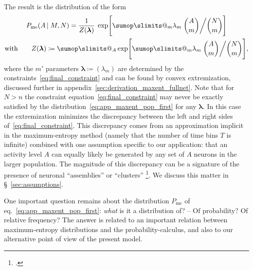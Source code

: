 \documentclass[\ifafour a4paper,12pt,\else a5paper,10pt,\fi%
onecolumn,oneside,article,%
british%
]{memoir}
\makeatletter
\theoremstyle{remark}
\theoremstyle{innote}
\def\sum{\DOTSI\sumop\slimits@}
\newcommand*{\citep}{\footcites}
\newcommand*{\defd}{\coloneqq}
\renewcommand*{\|}{\nonscript\,\vert\nonscript\;\mathopen{}}
\newcommand*{\sect}{\S}%
\newcommand*{\chap}{ch.}%
\newcommand*{\eqn}{eq.}%
\newcommand*{\yAv}{A}
\newcommand*{\yA}{\yAv}%
\newcommand*{\yll}{\bm{\lambda}}
\newcommand*{\yl}{\lambda}
\newcommand*{\px}{P_{\text{me}}}
\newcommand*{\yla}{\bm{\lambda}}
\makeatother
\begin{document}
The result is the distribution of the form
\begin{equation}
  \label{eq:app_maxent_pop_first}
  \begin{gathered}
  \px(\yA \| M, N)  = \frac{1}{Z(\yll)}\;
  \exp\Biggl[\sum_{m}\yl_{m}\;
  \binom{\yA}{m}\bigg/\binom{N}{m}
  \Biggr]
  \\
\text{with}\qquad  Z(\yll)\defd \sum_{\yA}
  \exp\Biggl[\sum_{m}\yl_{m}\;
  \binom{\yA}{m}\bigg/\binom{N}{m}
  \Biggr],
\end{gathered}
\end{equation}
where the $m'$ parameters $\yll \defd (\yl_{m})$ are determined by the
constraints~\eqref{eq:final_constraint} and can be found by convex
extremization, discussed further in
appendix~\ref{sec:derivation_maxent_fullnet}. Note that for $N>n$ the
constraint equation~\eqref{eq:final_constraint} may never be exactly
satisfied by the distribution~\eqref{eq:app_maxent_pop_first} for any
$\yla$. In this case the extremization minimizes the discrepancy between
the left and right sides of~\eqref{eq:final_constraint}. This discrepancy
comes from an approximation implicit in the maximum-entropy method (namely
that the number of time bins $T$ is infinite) combined with one assumption
specific to our application: that an activity level $\yA$ can equally
likely be generated by any set of $\yA$ neurons in the larger population.
The magnitude of this discrepancy can be a signature of the presence of
neuronal \enquote{assemblies} or \enquote{clusters}
\citep[\chap~12]{gerstneretal2014}{hebb1949_r2002}. We discuss this matter
in \sect~\ref{sec:assumptions}.

\bigskip

One important question remains about the distribution $\px$ of
\eqn~\eqref{eq:app_maxent_pop_first}: \emph{what} is it a distribution of?
-- Of probability? Of relative frequency? The answer is related to an
important relation between maximum-entropy distributions and the
probability-calculus, and also to our alternative point of view of the
present model.
\end{document}
